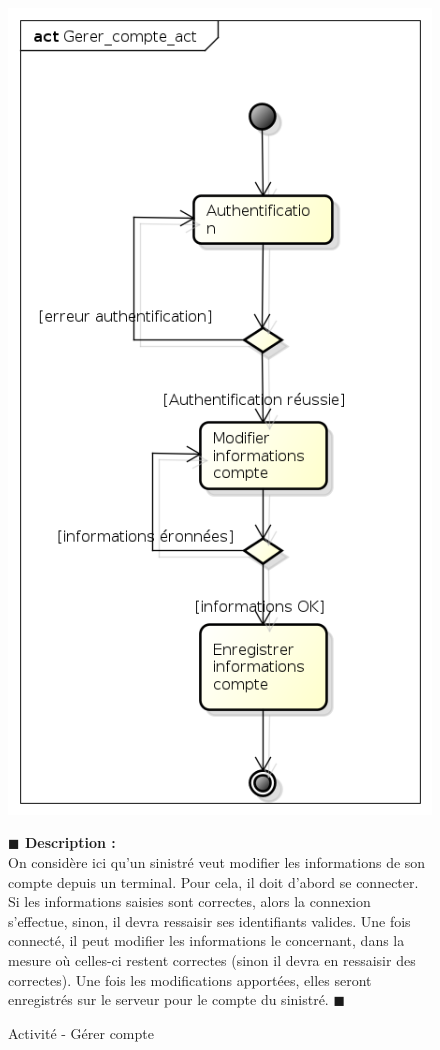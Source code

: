 \documentclass[11pt, titlepage]{report}
\newcommand{\debutDescription}{\noindent\textbf{\textcolor{DescriptionColor}{$\blacksquare$  Description : \\}}}
\newcommand{\finDescription}{\noindent\textcolor{DescriptionColor}{$\blacksquare$}}
\begin{document}
\begin{figure}[h!]
\begin{center}
\includegraphics[scale=.4]{../images/diagrammes/uml/complementaire/Gerer_compte_act.png} 
\caption{Activité - Gérer compte}
\end{center}
\debutDescription
On considère ici qu'un sinistré veut modifier les informations de son compte depuis un terminal. Pour cela, il doit d'abord se connecter. Si les informations saisies sont correctes, alors la connexion s'effectue, sinon, il devra ressaisir ses identifiants valides. Une fois connecté, il peut modifier les informations le concernant, dans la mesure où celles-ci restent correctes (sinon il devra en ressaisir des correctes). Une fois les modifications apportées, elles seront enregistrés sur le serveur pour le compte du sinistré.
\finDescription
\end{figure}
\end{document}
